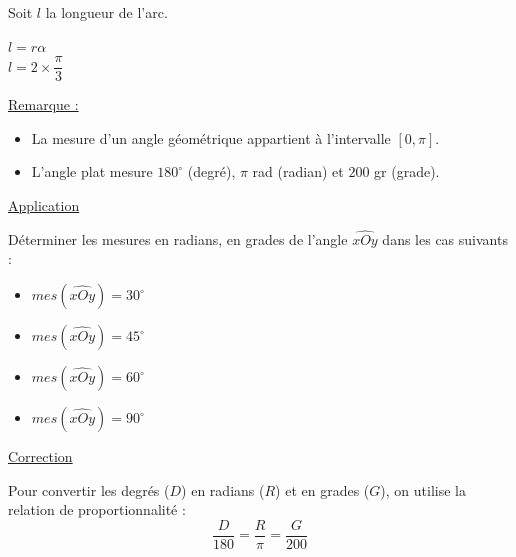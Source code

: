 \documentclass[12pt,a4paper]{article}
\begin{document}
\noindent Soit $l$ la longueur de l'arc.

\noindent $l = r\alpha$ \\
$l = 2 \times \dfrac{\pi}{3}$ 

\vspace{0.5em}

\begin{center}
    \setlength{\fboxrule}{1pt}
\end{center}

\noindent \textcolor{monRouge}{\underline{Remarque :}}

\begin{itemize}
    \item[i)] La mesure d'un angle géométrique appartient à l'intervalle $[0, \pi]$.
    \item[ii)] L'angle plat mesure \textcolor{monRouge}{$180^{\circ}$} (degré), \textcolor{monRouge}{$\pi$ rad} (radian) et \textcolor{monRouge}{$200$ gr} (grade).
\end{itemize}

\vspace{1em}

\begin{center}
    \textcolor{monRouge}{\underline{Application}}
\end{center}

\noindent Déterminer les mesures en radians, en grades de l'angle $\widehat{xOy}$ dans les cas suivants :

\begin{itemize}
    \item[a)] $mes(\widehat{xOy}) = 30^{\circ}$
    \item[b)] $mes(\widehat{xOy}) = 45^{\circ}$
    \item[c)] $mes(\widehat{xOy}) = 60^{\circ}$
    \item[d)] $mes(\widehat{xOy}) = 90^{\circ}$
\end{itemize}
\begin{center}
    \textcolor{monRouge}{\underline{Correction}}
\end{center}

Pour convertir les degrés ($D$) en radians ($R$) et en grades ($G$), on utilise la relation de proportionnalité :
\[ \frac{D}{180} = \frac{R}{\pi} = \frac{G}{200} \]
\end{document}
